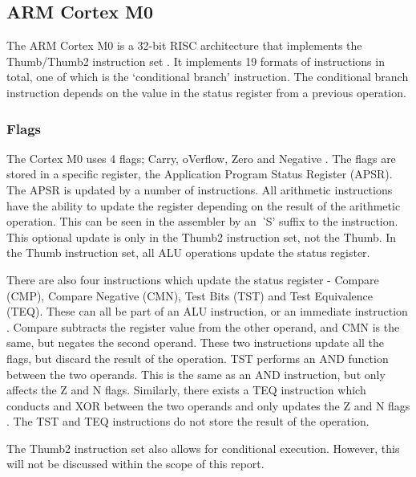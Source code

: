 \documentclass[12pt,a4paper]{article}
\begin{document}
\begin{bibunit}[is-unsrt]
\subsection{ARM Cortex M0}

The ARM Cortex M0 is a 32-bit RISC architecture that implements the Thumb/Thumb2 instruction set \cite{ARM:CortexM0}. 
It implements 19 formats of instructions in total, one of which is the `conditional branch' instruction. 
The conditional branch instruction depends on the value in the status register from a previous operation.

\subsubsection{Flags}
The Cortex M0 uses 4 flags; Carry, oVerflow, Zero and Negative \cite{ARM:Flags}. 
The flags are stored in a specific register, the Application Program Status Register (APSR). 
The APSR is updated by a number of instructions. 
All arithmetic instructions have the ability to update the register depending on the result of the arithmetic operation. 
This can be seen in the assembler by an {\textit `S'} suffix to the instruction.
This optional update is only in the Thumb2 instruction set, not the Thumb.
In the Thumb instruction set, all ALU operations update the status register.

There are also four instructions which update the status register - Compare (CMP), Compare Negative (CMN), Test Bits (TST) and Test Equivalence (TEQ).
These can all be part of an ALU instruction, or an immediate instruction \cite{ARM:CMPCMN}.
Compare subtracts the register value from the other operand, and CMN is the same, but negates the second operand.
These two instructions update all the flags, but discard the result of the operation.
TST performs an AND function between the two operands. 
This is the same as an AND instruction, but only affects the Z and N flags.
Similarly, there exists a TEQ instruction which conducts and XOR between the two operands and only updates the Z and N flags \cite{ARM:TSTTEQ}.
The TST and TEQ instructions do not store the result of the operation.

The Thumb2 instruction set also allows for conditional execution. 
However, this will not be discussed within the scope of this report.


\end{bibunit}
\end{document}

